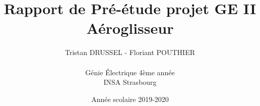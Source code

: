 \documentclass[a4paper,12pt]{report}
\title{Rapport de Pré-étude projet GE II\\Aéroglisseur}
\author{Tristan DRUSSEL - Floriant POUTHIER \\ \\ Génie Électrique 4ème année\\ INSA Strasbourg}
\date{Année scolaire 2019-2020}
\begin{document}
	\begin{titlepage}
		\maketitle
	\end{titlepage}
	\tableofcontents
	\newpage
\end{document}

